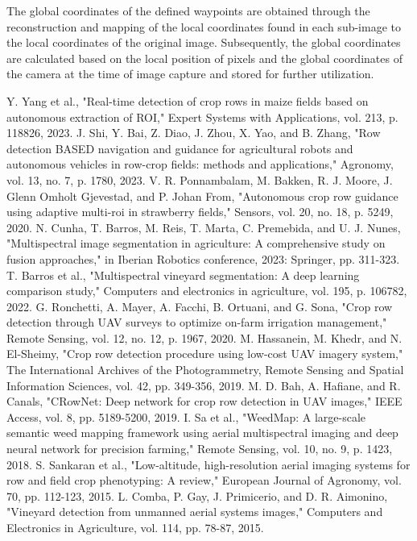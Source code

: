 \documentclass[conference]{IEEEtran}
\begin{document}
The global coordinates of the defined waypoints are obtained through the reconstruction and mapping of the local coordinates found in each sub-image to the local coordinates of the original image. Subsequently, the global coordinates are calculated based on the local position of pixels and the global coordinates of the camera at the time of image capture and stored for further utilization.


\begin{thebibliography}{00}
 Y. Yang et al., "Real-time detection of crop rows in maize fields based on autonomous extraction of ROI," Expert Systems with Applications, vol. 213, p. 118826, 2023.
 J. Shi, Y. Bai, Z. Diao, J. Zhou, X. Yao, and B. Zhang, "Row detection BASED navigation and guidance for agricultural robots and autonomous vehicles in row-crop fields: methods and applications," Agronomy, vol. 13, no. 7, p. 1780, 2023.
 V. R. Ponnambalam, M. Bakken, R. J. Moore, J. Glenn Omholt Gjevestad, and P. Johan From, "Autonomous crop row guidance using adaptive multi-roi in strawberry fields," Sensors, vol. 20, no. 18, p. 5249, 2020.
 N. Cunha, T. Barros, M. Reis, T. Marta, C. Premebida, and U. J. Nunes, "Multispectral image segmentation in agriculture: A comprehensive study on fusion approaches," in Iberian Robotics conference, 2023: Springer, pp. 311-323.
 T. Barros et al., "Multispectral vineyard segmentation: A deep learning comparison study," Computers and electronics in agriculture, vol. 195, p. 106782, 2022.
 G. Ronchetti, A. Mayer, A. Facchi, B. Ortuani, and G. Sona, "Crop row detection through UAV surveys to optimize on-farm irrigation management," Remote Sensing, vol. 12, no. 12, p. 1967, 2020.
 M. Hassanein, M. Khedr, and N. El-Sheimy, "Crop row detection procedure using low-cost UAV imagery system," The International Archives of the Photogrammetry, Remote Sensing and Spatial Information Sciences, vol. 42, pp. 349-356, 2019.
 M. D. Bah, A. Hafiane, and R. Canals, "CRowNet: Deep network for crop row detection in UAV images," IEEE Access, vol. 8, pp. 5189-5200, 2019.
 I. Sa et al., "WeedMap: A large-scale semantic weed mapping framework using aerial multispectral imaging and deep neural network for precision farming," Remote Sensing, vol. 10, no. 9, p. 1423, 2018.
 S. Sankaran et al., "Low-altitude, high-resolution aerial imaging systems for row and field crop phenotyping: A review," European Journal of Agronomy, vol. 70, pp. 112-123, 2015.
 L. Comba, P. Gay, J. Primicerio, and D. R. Aimonino, "Vineyard detection from unmanned aerial systems images," Computers and Electronics in Agriculture, vol. 114, pp. 78-87, 2015.

\end{thebibliography}
\end{document}
